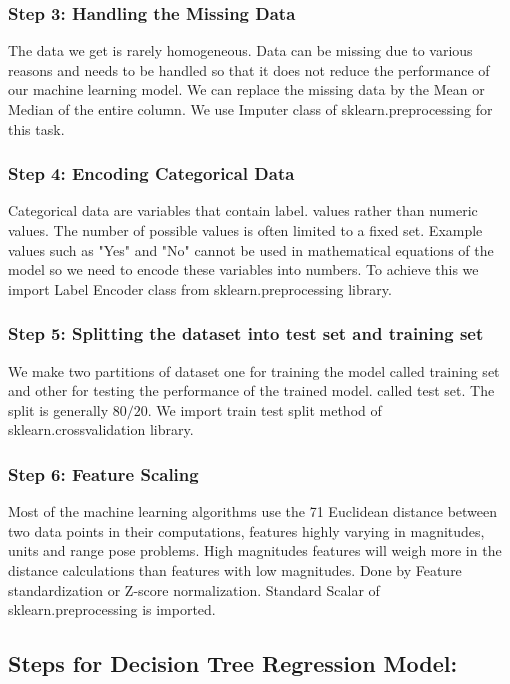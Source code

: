 \subsubsection{Step 3: Handling the Missing Data}
The data we get is rarely homogeneous. Data can be missing due to various reasons and needs to be handled so that it does not reduce the performance of our machine learning model. We can replace the missing data by the Mean or Median of the entire column. We use Imputer class of sklearn.preprocessing for this task.

\subsubsection{Step 4: Encoding Categorical Data}
Categorical data are variables that contain label. values rather than numeric values. The number of possible values is often limited to a fixed set. Example values
 such as "Yes" and "No" cannot be used in mathematical equations of the model so we need to encode these variables into numbers. To achieve this we import Label Encoder class from sklearn.preprocessing library.
 
\subsubsection{Step 5: Splitting the dataset into test set and training set}
We make two partitions of dataset one for training the
model called training set and other for testing the performance of the trained model. called test set. The
split is generally $80/20$. We import train test split  method of sklearn.crossvalidation library.

\subsubsection{Step 6: Feature Scaling}
Most of the machine learning algorithms use the
71	Euclidean distance between two data points in their 
computations, features highly varying in magnitudes, units and range pose problems. High magnitudes features will weigh more in the distance calculations than features with low magnitudes. Done by Feature standardization or Z-score normalization. Standard Scalar of sklearn.preprocessing is imported.




\subsection{Steps for Decision Tree Regression Model:}
